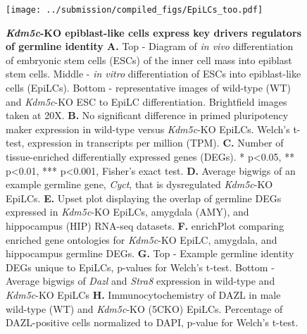 \documentclass[
]{article}
\begin{document}
\begin{figure}
  \centering 
  \texttt{[image: ../submission/compiled\_figs/EpiLCs\_too.pdf]}
  \caption[\textit{Kdm5c}-KO epiblast-like cells express key drivers of germline identity ]{\textbf{\textit{Kdm5c}-KO epiblast-like cells express key drivers regulators of germline identity A.} Top - Diagram of \textit{in vivo} differentiation of embryonic stem cells (ESCs) of the inner cell mass into epiblast stem cells. Middle - \textit{in vitro} differentiation of ESCs into epiblast-like cells (EpiLCs). Bottom - representative images of wild-type (WT) and \textit{Kdm5c}-KO ESC to EpiLC differentiation. Brightfield images taken at 20X. \textbf{B.} No significant difference in primed pluripotency maker expression in wild-type versus \textit{Kdm5c}-KO EpiLCs. Welch's t-test, expression in transcripts per million (TPM). \textbf{C.} Number of tissue-enriched differentially expressed genes (DEGs). * p<0.05, ** p<0.01, *** p<0.001, Fisher's exact test. \textbf{D.} Average bigwigs of an example germline gene, \textit{Cyct}, that is dysregulated \textit{Kdm5c}-KO EpiLCs. \textbf{E.} Upset plot displaying the overlap of germline DEGs expressed in \textit{Kdm5c}-KO EpiLCs, amygdala (AMY), and hippocampus (HIP) RNA-seq datasets. \textbf{F.} enrichPlot comparing enriched gene ontologies for \textit{Kdm5c}-KO EpiLC, amygdala, and hippocampus germline DEGs. \textbf{G.} Top - Example germline identity DEGs unique to EpiLCs, p-values for Welch's t-test. Bottom - Average bigwigs of \textit{Dazl} and \textit{Stra8} expression in wild-type and \textit{Kdm5c}-KO EpiLCs \textbf{H.} Immunocytochemistry of DAZL in male wild-type (WT) and \textit{Kdm5c}-KO (5CKO) EpiLCs. Percentage of DAZL-positive cells normalized to DAPI, p-value for Welch's t-test.}
  \label{figurelabel}
\end{figure}
\end{document}

